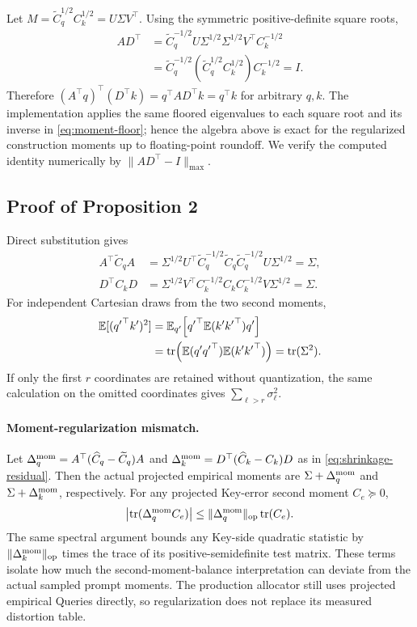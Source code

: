 Let
$M=\widetilde C_q^{1/2}C_k^{1/2}=U\Sigma V^\top$.
Using the symmetric positive-definite square roots,
\begin{align}
 AD^\top
 &=\widetilde C_q^{-1/2}U\Sigma^{1/2}
   \Sigma^{1/2}V^\top C_k^{-1/2}\\
 &=\widetilde C_q^{-1/2}
   \left(\widetilde C_q^{1/2}C_k^{1/2}\right)
   C_k^{-1/2}
 =I.
\end{align}
Therefore
$(A^\top q)^\top(D^\top k)=q^\top AD^\top k=q^\top k$ for arbitrary
$q,k$.
The implementation applies the same floored eigenvalues to each square root
and its inverse in \cref{eq:moment-floor}; hence the algebra above is exact
for the regularized construction moments up to floating-point roundoff.
We verify the computed identity numerically by $\|AD^\top-I\|_{\max}$.

\subsection{Proof of Proposition 2}

Direct substitution gives
\begin{align}
 A^\top\widetilde C_qA
 &=\Sigma^{1/2}U^\top
 \widetilde C_q^{-1/2}\widetilde C_q
 \widetilde C_q^{-1/2}U\Sigma^{1/2}
 =\Sigma,\\
 D^\top C_kD
 &=\Sigma^{1/2}V^\top C_k^{-1/2}C_k
 C_k^{-1/2}V\Sigma^{1/2}
 =\Sigma.
\end{align}
For independent Cartesian draws from the two second moments,
\begin{align}
 \mathbb E[({q'}^\top k')^2]
 &=\mathbb E_{q'}\!\left[
 {q'}^\top\mathbb E(k'{k'}^\top)q'\right]\\
 &=\operatorname{tr}\!\left(\mathbb E(q'{q'}^\top)
              \mathbb E(k'{k'}^\top)\right)
 =\operatorname{tr}(\Sigma^2).
\end{align}
If only the first $r$ coordinates are retained without quantization, the same
calculation on the omitted coordinates gives
$\sum_{\ell>r}\sigma_\ell^2$.

\paragraph{Moment-regularization mismatch.}
Let
$\Delta_q^{\rm mom}=A^\top(\widehat C_q-\widetilde C_q)A$ and
$\Delta_k^{\rm mom}=D^\top(\widehat C_k-C_k)D$ as in
\cref{eq:shrinkage-residual}.
Then the actual projected empirical moments are
$\Sigma+\Delta_q^{\rm mom}$ and
$\Sigma+\Delta_k^{\rm mom}$, respectively.
For any projected Key-error second moment $C_e\succeq0$,
\begin{equation}
 \left|\operatorname{tr}(\Delta_q^{\rm mom}C_e)\right|
 \le\|\Delta_q^{\rm mom}\|_{\mathrm{op}}\operatorname{tr}(C_e).
\end{equation}
The same spectral argument bounds any Key-side quadratic statistic by
$\|\Delta_k^{\rm mom}\|_{\mathrm{op}}$ times the trace of its positive-semidefinite
test matrix.  These terms isolate how much the second-moment-balance
interpretation can deviate from the actual sampled prompt moments.
The production allocator still uses projected empirical Queries directly, so
regularization does not replace its measured distortion table.

